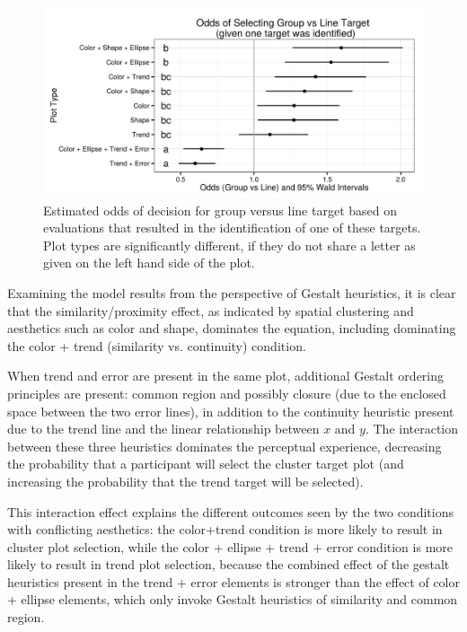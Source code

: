 \documentclass[11pt]{isuthesis}\usepackage[]{graphicx}\usepackage[]{color}
\newenvironment{knitrout}{}{} %
\begin{document}
\begin{figure}[ht]\centering
\begin{knitrout}
\color{fgcolor}

{\centering \includegraphics[width=.85\linewidth]{Figure/FeatureHierarchy/fig-group-vs-line-1} 

}



\end{knitrout}
\caption[Estimated odds of decision for group versus line target]{\label{fig:faceoff} Estimated odds of decision for group versus line target based on evaluations that resulted in the identification of one of these targets. Plot types are significantly different, if they do not share a letter as given on the left hand side of the plot.}
\end{figure}

Examining the model results from the perspective of Gestalt heuristics, it is clear that the similarity/proximity effect, as indicated by spatial clustering and aesthetics such as color and shape, dominates the equation, including dominating the color + trend (similarity vs. continuity) condition. 

When trend and error are present in the same plot, additional Gestalt ordering principles are present: common region and possibly closure (due to the enclosed space between the two error lines), in addition to the continuity heuristic present due to the trend line and the linear relationship between $x$ and $y$. The interaction between these three heuristics dominates the perceptual experience, decreasing the probability that a participant will select the cluster target plot (and increasing the probability that the trend target will be selected). 

This interaction effect explains the different outcomes seen by the two conditions with conflicting aesthetics: the color+trend condition is more likely to result in cluster plot selection, while the color + ellipse + trend + error condition is more likely to result in trend plot selection, because the combined effect of the gestalt heuristics present in the trend + error elements is stronger than the effect of color + ellipse elements, which only invoke Gestalt heuristics of similarity and common region. 
\end{document}
